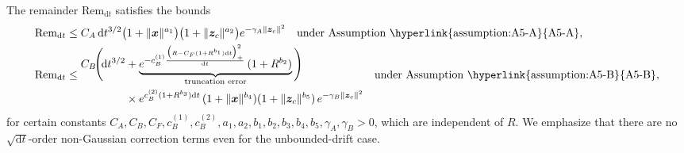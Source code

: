 The remainder $\mathrm{Rem}_{\mathrm dt}$ satisfies the bounds
\begin{subequations}\label{seq:rem_dt}
\renewcommand{\theequation}{\theparentequation-\Alph{equation}}
\begin{align}
  \mathrm{Rem}_{\mathrm dt}&
  \leq C_A\,\mathrm dt^{3/2}
  \big(1+\|\bm x\|^{a_1}\big)
  \big(1+\|\bm z_c\|^{a_2}\big)
  e^{-\gamma_A\|\bm z_c\|^2}
  \quad\text{under Assumption~\hyperlink{assumption:A5-A}{A5-A}}
  \label{seq:rem_dt_A},
  \\
  \mathrm{Rem}_{\mathrm dt}
  &\leq
  \begin{aligned}
    C_B\!\Bigg(\!
    \mathrm dt^{3/2}
    &+\underbrace{e^{-c_{B}^{(1)}\frac{\big(R-C_F(1+R^{b_1})\mathrm dt\big)_+^2}{\mathrm dt}}
    \,(1+R^{b_2})
    }_{\text{truncation error}}
    \Bigg)
    \\
    &\times
    e^{c_{B}^{(2)}(1+R^{b_3})\mathrm dt}\,
    (1+\|\bm x\|^{b_4})
    (1+\|\bm z_c\|^{b_5})\,e^{-\gamma_B\|\bm z_c\|^2}
  \end{aligned}
  \quad\text{under Assumption~\hyperlink{assumption:A5-B}{A5-B}},
  \label{seq:rem_dt_B}
\end{align}
\end{subequations}
for certain constants $C_A,C_B,C_F,c_B^{(1)},c_B^{(2)},a_1,a_2,b_1,b_2,b_3,b_4,b_5,\gamma_A,\gamma_B>0$, which are independent of $R$.
We emphasize that there are no $\sqrt{\mathrm dt}$-order non-Gaussian correction terms even for the unbounded-drift case.

